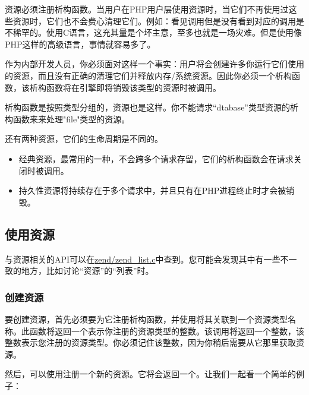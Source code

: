 资源必须注册析构函数。当用户在PHP用户层使用资源时，当它们不再使用过这些资源时，它们也不会费心清理它们。例如：看见调用但是没有看到对应的调用是不稀罕的。使用C语言，这充其量是个坏主意，至多也就是一场灾难。但是使用像PHP这样的高级语言，事情就容易多了。

作为内部开发人员，你必须面对这样一个事实：用户将会创建许多你运行它们使用的资源，而且没有正确的清理它们并释放内存/系统资源。因此你必须一个析构函数，该析构函数将在引擎即将销毁该类型的资源时被调用。

析构函数是按照类型分组的，资源也是这样。你不能请求“dtabase”类型资源的析构函数来来处理"file"类型的资源。

还有两种资源，它们的生命周期是不同的。

\begin{itemize}
        \item  经典资源，最常用的一种，不会跨多个请求存留，它们的析构函数会在请求关闭时被调用。
        \item 持久性资源将持续存在于多个请求中，并且只有在PHP进程终止时才会被销毁。
\end{itemize}



\subsection{使用资源}

与资源相关的API可以在\href{https://github.com/php/php-src/blob/3704947696fe0ee93e025fa85621d297ac7a1e4d/Zend/zend_list.c}{zend/zend\_list.c}中查到。您可能会发现其中有一些不一致的地方，比如讨论“资源”的“列表”时。

\subsubsection{创建资源}

要创建资源，首先必须要为它注册析构函数，并使用将其关联到一个资源类型名称。此函数将返回一个表示你注册的资源类型的整数。该调用将返回一个整数，该整数表示您注册的资源类型。你必须记住该整数，因为你稍后需要从它那里获取资源。

然后，可以使用注册一个新的资源。它将会返回一个。让我们一起看一个简单的例子：

